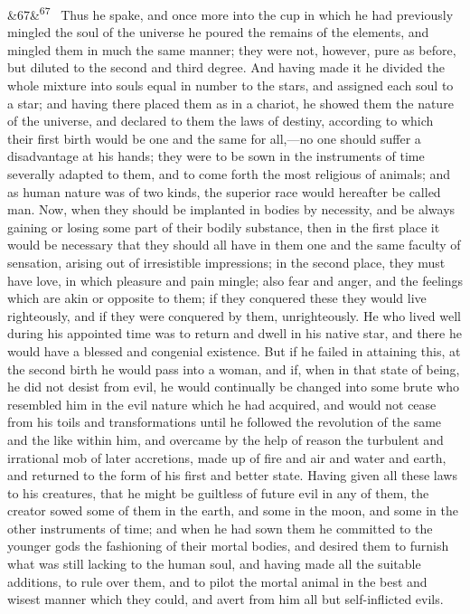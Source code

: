 \documentclass[12pt]{article}
\newcommand{\para}[1][]{\par\noindent\ifx&#1&\else\textsuperscript{\footnotesize #1}~\fi}
\begin{document}
\para[67] Thus he spake, and once more into the cup in which he had previously mingled the soul of the universe he poured the remains of the elements, and mingled them in much the same manner; they were not, however, pure as before, but diluted to the second and third degree. And having made it he divided the whole mixture into souls equal in number to the stars, and assigned each soul to a star; and having there placed them as in a chariot, he showed them the nature of the universe, and declared to them the laws of destiny, according to which their first birth would be one and the same for all,---no one should suffer a disadvantage at his hands; they were to be sown in the instruments of time severally adapted to them, and to come forth the most religious of animals; and as human nature was of two kinds, the superior race would hereafter be called man. Now, when they should be implanted in bodies by necessity, and be always gaining or losing some part of their bodily substance, then in the first place it would be necessary that they should all have in them one and the same faculty of sensation, arising out of irresistible impressions; in the second place, they must have love, in which pleasure and pain mingle; also fear and anger, and the feelings which are akin or opposite to them; if they conquered these they would live righteously, and if they were conquered by them, unrighteously. He who lived well during his appointed time was to return and dwell in his native star, and there he would have a blessed and congenial existence. But if he failed in attaining this, at the second birth he would pass into a woman, and if, when in that state of being, he did not desist from evil, he would continually be changed into some brute who resembled him in the evil nature which he had acquired, and would not cease from his toils and transformations until he followed the revolution of the same and the like within him, and overcame by the help of reason the turbulent and irrational mob of later accretions, made up of fire and air and water and earth, and returned to the form of his first and better state. Having given all these laws to his creatures, that he might be guiltless of future evil in any of them, the creator sowed some of them in the earth, and some in the moon, and some in the other instruments of time; and when he had sown them he committed to the younger gods the fashioning of their mortal bodies, and desired them to furnish what was still lacking to the human soul, and having made all the suitable additions, to rule over them, and to pilot the mortal animal in the best and wisest manner which they could, and avert from him all but self-inflicted evils.
\end{document}
